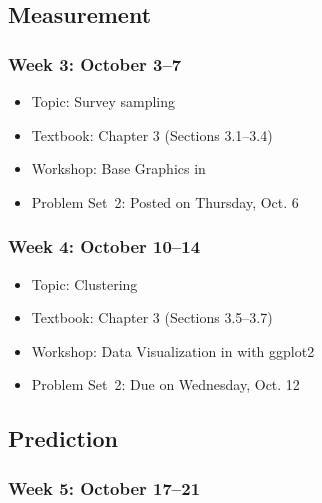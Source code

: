 \documentclass[11pt]{article}
\begin{document}
\subsection*{Measurement}

\subsubsection*{\sc Week 3: October 3--7}

\begin{itemize}

\item {\sc Topic}: Survey sampling

\item {\sc Textbook}: Chapter 3 (Sections 3.1--3.4)

\item {\sc Workshop}: Base Graphics in \R 

\item {\sc Problem Set~2}: Posted on Thursday, Oct. 6

\end{itemize}

\subsubsection*{\sc Week 4: October 10--14}

\begin{itemize}

\item {\sc Topic}: Clustering

\item {\sc Textbook}: Chapter 3 (Sections 3.5--3.7)

\item {\sc Workshop}: Data Visualization in \R{} with \textsf{ggplot2}

\item {\sc Problem Set~2}: Due on Wednesday, Oct. 12

\end{itemize}

\subsection*{Prediction}

\subsubsection*{\sc Week 5: October 17--21}
\end{document}
